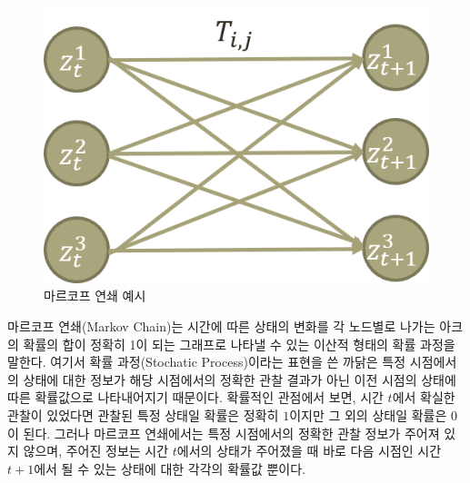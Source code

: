 \documentclass[a4paper]{oblivoir}
\begin{document}
\begin{figure}[ht] \centering 
\includegraphics[scale=0.8]{fig10_8.png} 
\caption{마르코프 연쇄 예시}
\label{fig:10-8}
\end{figure}  
마르코프 연쇄(Markov Chain)는 시간에 따른 상태의 변화를 각 노드별로 나가는 아크의 확률의 합이 정확히 1이 되는 그래프로 나타낼 수 있는 이산적 형태의 확률 과정을 말한다. 여기서 확률 과정(Stochatic Process)이라는 표현을 쓴 까닭은 특정 시점에서의 상태에 대한 정보가 해당 시점에서의 정확한 관찰 결과가 아닌 이전 시점의 상태에 따른 확률값으로 나타내어지기 때문이다. 확률적인 관점에서 보면, 시간 $t$에서 확실한 관찰이 있었다면 관찰된 특정 상태일 확률은 정확히 $1$이지만 그 외의 상태일 확률은 $0$이 된다. 그러나 마르코프 연쇄에서는 특정 시점에서의 정확한 관찰 정보가 주어져 있지 않으며, 주어진 정보는 시간 $t$에서의 상태가 주어졌을 때 바로 다음 시점인 시간 $t+1$에서 될 수 있는 상태에 대한 각각의 확률값 뿐이다. \\
 
\end{document}
